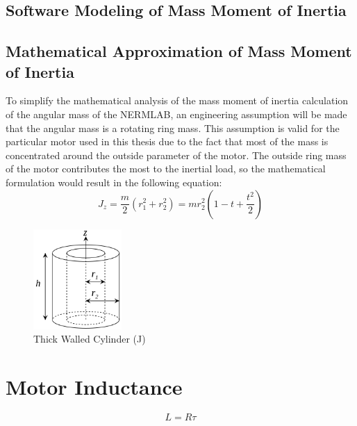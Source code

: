 \subsection{Software Modeling of Mass Moment of Inertia}
\subsection{Mathematical Approximation of Mass Moment of Inertia}
To simplify the mathematical analysis of the mass moment of inertia calculation of the angular mass of the NERMLAB, an engineering assumption will be made that the angular mass is a rotating ring mass. This assumption is valid for the particular motor used in this thesis due to the fact that most of the mass is concentrated around the outside parameter of the motor. The outside ring mass of the motor contributes the most to the inertial load, so the mathematical formulation would result in the following equation:
\[J_z = \frac{m}{2}(r_1^2 + r_2^2) = mr_2^2(1-t+\frac{t^2}{2})\]

\begin{figure}[htb]%
\begin{center}
    \includegraphics[height=1.5in]{figures/thick_walled_cylinder.png}

    \caption[Thick Walled Cylinder - Mass Moment of Inertia]{Thick Walled Cylinder (J)}

    \label{thick_walled_cylinder}
\end{center}
\end{figure}

\section{Motor Inductance}

\[L = R\tau\]